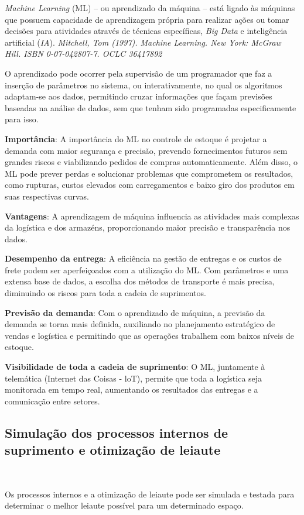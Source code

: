 \documentclass{amsart}
\begin{document}
{\it Machine Learning} (ML) – ou aprendizado da máquina – está ligado às máquinas que possuem capacidade de aprendizagem própria para realizar ações ou tomar decisões para atividades através de técnicas específicas, {\it Big Data} e inteligência artificial ({\it IA}). {\it Mitchell, Tom (1997). Machine Learning. New York: McGraw Hill. ISBN 0-07-042807-7. OCLC 36417892}  

O aprendizado pode ocorrer pela supervisão de um programador que faz a inserção de parâmetros no sistema, ou interativamente, no qual os algoritmos adaptam-se aos dados, permitindo cruzar informações que façam previsões baseadas na análise de dados, sem que tenham sido programadas especificamente para isso.

{\bf Importância}: A importância do ML no controle de estoque é projetar a demanda com maior segurança e precisão, prevendo fornecimentos futuros sem grandes riscos e viabilizando pedidos de compras automaticamente. Além disso, o ML pode prever perdas e solucionar problemas que comprometem os resultados, como rupturas, custos elevados com carregamentos e baixo giro dos produtos em suas respectivas curvas.

{\bf Vantagens}: A aprendizagem de máquina influencia as atividades mais complexas da logística e dos armazéns, proporcionando maior precisão e transparência nos dados.

{\bf Desempenho da entrega}: A eficiência na gestão de entregas e os custos de frete podem ser aperfeiçoados com a utilização do ML. Com parâmetros e uma extensa base de dados, a escolha dos métodos de transporte é mais precisa, diminuindo os riscos para toda a cadeia de suprimentos.

{\bf Previsão da demanda}: Com o aprendizado de máquina, a previsão da demanda se torna mais definida, auxiliando no planejamento estratégico de vendas e logística e permitindo que as operações trabalhem com baixos níveis de estoque.

{\bf Visibilidade de toda a cadeia de suprimento}: O ML, juntamente à telemática (Internet das Coisas - loT), permite que toda a logística seja monitorada em tempo real, aumentando os resultados das entregas e a comunicação entre setores.

\subsection{Simulação dos processos internos de suprimento e otimização de leiaute}\

Os processos internos e a otimização de leiaute pode ser simulada e testada para determinar o melhor leiaute possível para um determinado espaço.
\end{document}
